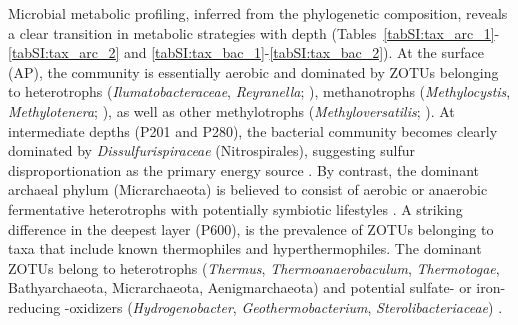 Microbial metabolic profiling, inferred from the phylogenetic composition, reveals a clear transition in metabolic strategies with depth (Tables~\ref{tabSI:tax_arc_1}-\ref{tabSI:tax_arc_2} and \ref{tabSI:tax_bac_1}-\ref{tabSI:tax_bac_2}).
At the surface (AP), the community is essentially aerobic and dominated by ZOTUs belonging to heterotrophs (\textit{Ilumatobacteraceae}, \textit{Reyranella}; \cite{asem2018ilumato, cui2017reyranella}), methanotrophs (\textit{Methylocystis}, \textit{Methylotenera}; \cite{afshin2021methylotenera, bowman2015methylocystis}), as well as other methylotrophs (\textit{Methyloversatilis}; \cite{doronina2014methyloversatilis}).
At intermediate depths (P201 and P280), the bacterial community becomes clearly dominated by \textit{Dissulfurispiraceae} (Nitrospirales), suggesting sulfur disproportionation as the primary energy source \citep{umezawa2021dissulfurispira}.
By contrast, the dominant archaeal phylum (Micrarchaeota) is believed to consist of aerobic or anaerobic fermentative heterotrophs with potentially symbiotic lifestyles \citep{kadnikov2020micrarachaeota, chen2018micrarchaeota, sakai2022micrarchaeota}.
A striking difference in the deepest layer (P600), is the prevalence of ZOTUs belonging to taxa that include known thermophiles and hyperthermophiles.
The dominant ZOTUs belong to heterotrophs (\textit{Thermus}, \textit{Thermoanaerobaculum}, \textit{Thermotogae}, Bathyarchaeota, Micrarchaeota, Aenigmarchaeota) and potential sulfate- or iron-reducing -oxidizers (\textit{Hydrogenobacter}, \textit{Geothermobacterium}, \textit{Sterolibacteriaceae}) \citep{williams1995thermus, mori2014thermodesulfobacteriaceae, zeytun2011hydrogenobacter, kadnikov2020micrarachaeota, boden2017sterilo, kashefi2002geothermobacterium, garrido2023enrichment, losey2020thermoanaerobaculum}.


\FloatBarrier %

